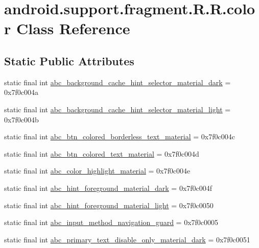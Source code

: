 \hypertarget{classandroid_1_1support_1_1fragment_1_1_r_1_1color}{
\section{android.support.fragment.R.R.color Class Reference}
\label{classandroid_1_1support_1_1fragment_1_1_r_1_1color}
}
\subsection*{Static Public Attributes}
\begin{CompactItemize}
\item 
static final int \hyperlink{classandroid_1_1support_1_1fragment_1_1_r_1_1color_1c000b4cd783d223f337b959d854df4a}{abc\_\-background\_\-cache\_\-hint\_\-selector\_\-material\_\-dark} = 0x7f0c004a
\item 
static final int \hyperlink{classandroid_1_1support_1_1fragment_1_1_r_1_1color_b969aa985b8480767c967d7637766c9b}{abc\_\-background\_\-cache\_\-hint\_\-selector\_\-material\_\-light} = 0x7f0c004b
\item 
static final int \hyperlink{classandroid_1_1support_1_1fragment_1_1_r_1_1color_5f18f6b0ac90d6b8c952199dbff417bf}{abc\_\-btn\_\-colored\_\-borderless\_\-text\_\-material} = 0x7f0c004c
\item 
static final int \hyperlink{classandroid_1_1support_1_1fragment_1_1_r_1_1color_82ecc8eb3bc042e2156ec3e6470f8529}{abc\_\-btn\_\-colored\_\-text\_\-material} = 0x7f0c004d
\item 
static final int \hyperlink{classandroid_1_1support_1_1fragment_1_1_r_1_1color_9e25269297fb1c3af1442fb14bb12faa}{abc\_\-color\_\-highlight\_\-material} = 0x7f0c004e
\item 
static final int \hyperlink{classandroid_1_1support_1_1fragment_1_1_r_1_1color_f4f340989ea0be5040bba64e6cae65db}{abc\_\-hint\_\-foreground\_\-material\_\-dark} = 0x7f0c004f
\item 
static final int \hyperlink{classandroid_1_1support_1_1fragment_1_1_r_1_1color_74fab4bb44459213537d5c07b383071d}{abc\_\-hint\_\-foreground\_\-material\_\-light} = 0x7f0c0050
\item 
static final int \hyperlink{classandroid_1_1support_1_1fragment_1_1_r_1_1color_762e158d86005b7be58add344e4aa08c}{abc\_\-input\_\-method\_\-navigation\_\-guard} = 0x7f0c0005
\item 
static final int \hyperlink{classandroid_1_1support_1_1fragment_1_1_r_1_1color_f125785e3faf92f0da98e47e827c597a}{abc\_\-primary\_\-text\_\-disable\_\-only\_\-material\_\-dark} = 0x7f0c0051

\end{CompactItemize}
